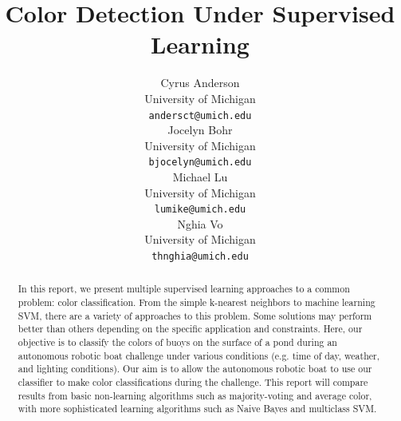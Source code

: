 \documentclass{article} %
\title{Color Detection Under Supervised Learning}
\author{
Cyrus Anderson \\
University of Michigan \\
\texttt{andersct@umich.edu} \\
\And
Jocelyn Bohr \\
University of Michigan \\
\texttt{bjocelyn@umich.edu} \\
\AND
Michael Lu \\
University of Michigan \\
\texttt{lumike@umich.edu} \\
\And
Nghia Vo \\
University of Michigan \\
\texttt{thnghia@umich.edu} \\
}
\begin{document}
\maketitle

\begin{abstract}
In this report, we present multiple supervised learning approaches to a common problem: color classification. From the simple k-nearest neighbors to machine learning SVM, there are a variety of approaches to this problem. Some solutions may perform better than others depending on the specific application and constraints. Here, our objective is to classify the colors of buoys on the surface of a pond during an autonomous robotic boat challenge under various conditions (e.g. time of day, weather, and lighting conditions). Our aim is to allow the autonomous robotic boat to use our classifier to make color classifications during the challenge. This report will compare results from basic non-learning algorithms such as majority-voting and average color, with more sophisticated learning algorithms such as Naive Bayes and multiclass SVM. 
\end{abstract}
\end{document}
